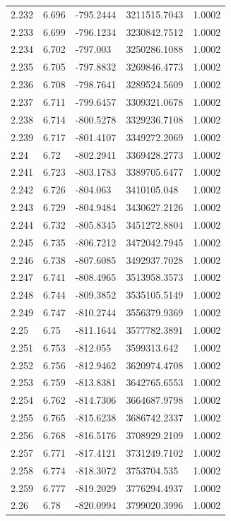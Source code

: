 \begin{tabular}{lllll}
2.232 & 6.696 & -795.2444 & 3211515.7043 & 1.0002 \\
2.233 & 6.699 & -796.1234 & 3230842.7512 & 1.0002 \\
2.234 & 6.702 & -797.003 & 3250286.1088 & 1.0002 \\
2.235 & 6.705 & -797.8832 & 3269846.4773 & 1.0002 \\
2.236 & 6.708 & -798.7641 & 3289524.5609 & 1.0002 \\
2.237 & 6.711 & -799.6457 & 3309321.0678 & 1.0002 \\
2.238 & 6.714 & -800.5278 & 3329236.7108 & 1.0002 \\
2.239 & 6.717 & -801.4107 & 3349272.2069 & 1.0002 \\
2.24 & 6.72 & -802.2941 & 3369428.2773 & 1.0002 \\
2.241 & 6.723 & -803.1783 & 3389705.6477 & 1.0002 \\
2.242 & 6.726 & -804.063 & 3410105.048 & 1.0002 \\
2.243 & 6.729 & -804.9484 & 3430627.2126 & 1.0002 \\
2.244 & 6.732 & -805.8345 & 3451272.8804 & 1.0002 \\
2.245 & 6.735 & -806.7212 & 3472042.7945 & 1.0002 \\
2.246 & 6.738 & -807.6085 & 3492937.7028 & 1.0002 \\
2.247 & 6.741 & -808.4965 & 3513958.3573 & 1.0002 \\
2.248 & 6.744 & -809.3852 & 3535105.5149 & 1.0002 \\
2.249 & 6.747 & -810.2744 & 3556379.9369 & 1.0002 \\
2.25 & 6.75 & -811.1644 & 3577782.3891 & 1.0002 \\
2.251 & 6.753 & -812.055 & 3599313.642 & 1.0002 \\
2.252 & 6.756 & -812.9462 & 3620974.4708 & 1.0002 \\
2.253 & 6.759 & -813.8381 & 3642765.6553 & 1.0002 \\
2.254 & 6.762 & -814.7306 & 3664687.9798 & 1.0002 \\
2.255 & 6.765 & -815.6238 & 3686742.2337 & 1.0002 \\
2.256 & 6.768 & -816.5176 & 3708929.2109 & 1.0002 \\
2.257 & 6.771 & -817.4121 & 3731249.7102 & 1.0002 \\
2.258 & 6.774 & -818.3072 & 3753704.535 & 1.0002 \\
2.259 & 6.777 & -819.2029 & 3776294.4937 & 1.0002 \\
2.26 & 6.78 & -820.0994 & 3799020.3996 & 1.0002 \\

\end{tabular}
